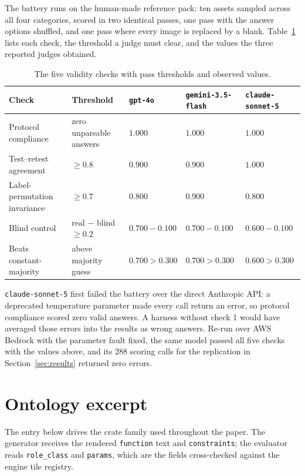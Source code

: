 \documentclass{article}
\begin{document}
The battery runs on the human-made reference pack: ten assets sampled across all four categories,
scored in two identical passes, one pass with the answer options shuffled, and one pass where every
image is replaced by a blank. Table~\ref{tab:battery} lists each check, the threshold a judge must
clear, and the values the three reported judges obtained.

\begin{table}[h]
  \centering
  \caption{The five validity checks with pass thresholds and observed values.}
  \label{tab:battery}
  \footnotesize
  \setlength{\tabcolsep}{4pt}
  \begin{tabular}{@{}lllll@{}}
    \toprule
    Check & Threshold & \texttt{gpt-4o} & \texttt{gemini-3.5-flash} & \texttt{claude-sonnet-5} \\
    \midrule
    Protocol compliance        & zero unparsable answers        & $1.000$ & $1.000$ & $1.000$ \\
    Test--retest agreement     & $\geq 0.8$                     & $0.900$ & $0.900$ & $1.000$ \\
    Label-permutation invariance & $\geq 0.7$                   & $0.800$ & $0.900$ & $0.800$ \\
    Blind control              & real $-$ blind $\geq 0.2$      & $0.700 - 0.100$ & $0.700 - 0.100$ & $0.600 - 0.100$ \\
    Beats constant-majority    & above majority guess           & $0.700 > 0.300$ & $0.700 > 0.300$ & $0.600 > 0.300$ \\
    \bottomrule
  \end{tabular}
\end{table}

\texttt{claude-sonnet-5} first failed the battery over the direct Anthropic API: a deprecated
temperature parameter made every call return an error, so protocol compliance scored zero valid
answers. A harness without check 1 would have averaged those errors into the results as wrong
answers. Re-run over AWS Bedrock with the parameter fault fixed, the same model passed all five
checks with the values above, and its 288 scoring calls for the replication in
Section~\ref{sec:results} returned zero errors.

\section{Ontology excerpt}
\label{app:ontology}

The entry below drives the crate family used throughout the paper. The generator receives the
rendered \texttt{function} text and \texttt{constraints}; the evaluator reads \texttt{role\_class}
and \texttt{params}, which are the fields cross-checked against the engine tile registry.
\end{document}
